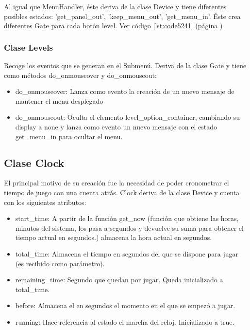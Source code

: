Al igual que MenuHandler, éste deriva de la clase Device  y tiene diferentes posibles estados:
'get\_panel\_out', 'keep\_menu\_out', 'get\_menu\_in'.
Éste crea diferentes Gate para cada botón level. Ver código  \ref{lst:code5241} (página \pageref{lst:code5241})


\subsubsection{Clase Levels}
\label{subsubsection:levels}

Recoge los eventos que se generan en el Submenú. 
Deriva de la clase Gate y tiene como métodos do\_onmouseover y do\_onmouseout:

\begin{itemize}
 \item do\_onmouseover: Lanza como evento la creación de un nuevo mensaje de mantener el menu desplegado

 \item do\_onmouseout: Oculta el elemento level\_option\_container, cambiando su display a none y lanza como evento un nuevo mensaje con el estado 
get\_menu\_in para ocultar el menu.
\end{itemize}


\subsection{Clase Clock}
\label{subsection:clock}

El principal motivo de su creación fue la necesidad de poder cronometrar el tiempo de juego con una cuenta atrás.
Clock deriva de la clase Device y cuenta con los siguientes atributos:

\begin{itemize}
 \item start\_time: A partir de la función get\_now (función que obtiene las horas, minutos del sistema, los pasa a segundos y devuelve su suma para 
obtener el tiempo actual en segundos.) almacena la hora actual en segundos.

 \item total\_time: Almacena el tiempo en segundos del que se dispone para jugar (es recibido como parámetro).
 
 \item remaining\_time: Segundo que quedan por jugar. Queda inicializado a total\_time.
 
 \item before: Almacena el en segundos el momento en el que se empezó a jugar.
 
 \item running: Hace referencia al estado el marcha del reloj. Inicializado a true.
\end{itemize}

